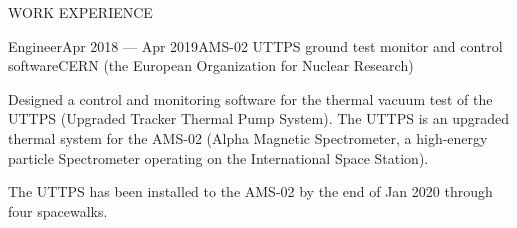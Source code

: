 \documentclass{resume} %
\begin{document}
\begin{rSection}{WORK EXPERIENCE}
\begin{rSubsection}{Engineer}{Apr 2018 --- Apr 2019}{}{AMS-02 UTTPS ground test monitor and control software}{CERN (the European Organization for Nuclear Research)}
\item Designed a control and monitoring software for the thermal vacuum test of the UTTPS (Upgraded Tracker Thermal Pump System). The UTTPS is an upgraded thermal system for the AMS-02 (Alpha Magnetic Spectrometer, a high-energy particle Spectrometer operating on the International Space Station).

\item The UTTPS has been installed to the AMS-02 by the end of Jan 2020 through four spacewalks.
\end{rSubsection}
\end{rSection}
\end{document}
